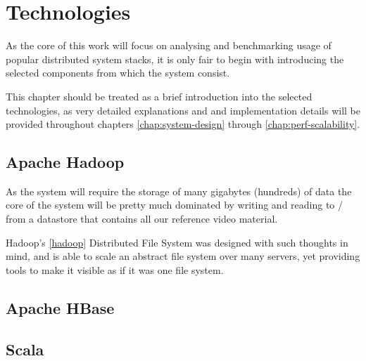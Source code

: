 \chapter{Technologies}
As the core of this work will focus on analysing and benchmarking usage of popular distributed system stacks, it is only fair to begin with introducing the selected components from which the system consist.

This chapter should be treated as a brief introduction into the selected technologies, as very detailed explanations and and implementation details will be provided throughout chapters \ref{chap:system-design} through \ref{chap:perf-scalability}.

\section{Apache Hadoop}
\label{sec:hadoop}
As the system will require the storage of many gigabytes (hundreds) of data the core of the system will be pretty much dominated by writing and reading to / from a datastore that contains all our reference video material.

Hadoop's \ref{hadoop} Distributed File System was designed with such thoughts in mind, and is able to scale an abstract file system over many servers, yet providing tools to make it visible as if it was one file system.


\section{Apache HBase}
\label{sec:hbase}


\section{Scala}
\label{sec:scala}


